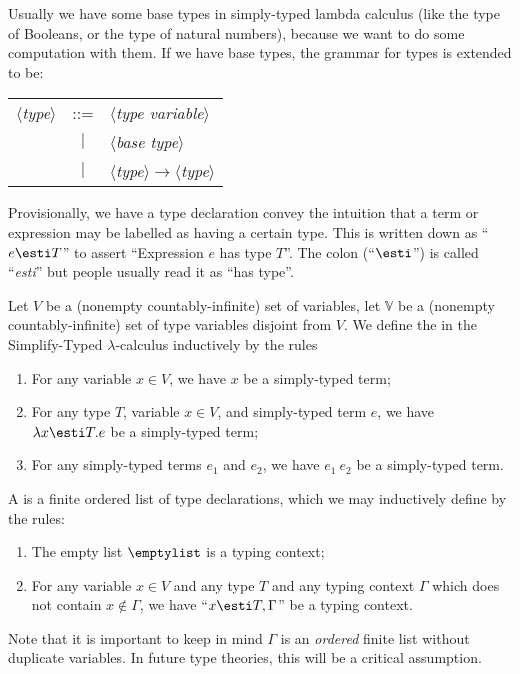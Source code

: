 \begin{node}[Syntax]
\begin{definition}
\begin{node}\label{stlc-0005}%
Usually we have some base types in simply-typed lambda calculus (like
the type of Booleans, or the type of natural numbers), because we want
to do some computation with them. If we have base types, the grammar for
types is extended to be:
\begin{center}
\begin{tabular}{rcl}
$\langle$\textit{type}$\rangle$ & ::= & $\langle$\textit{type variable}$\rangle$\\
& $|$ & $\langle$\textit{base type}$\rangle$\\
& $|$ & $\langle$\textit{type}$\rangle\to\langle$\textit{type}$\rangle$
\end{tabular}
\end{center}
\end{node}
\end{definition}

\begin{node}\label{stlc-0008}%
Provisionally, we have a type declaration convey the intuition that a
term or expression may be labelled as having a certain type. This is
written down as ``$e\esti T$'' to assert ``Expression $e$ has type
$T$''. The colon (``$\esti$'') is called ``\textit{esti}'' but people
usually read it as ``has type''.
\end{node}

\begin{definition}\label{stlc-0006}%
Let $V$ be a (nonempty countably-infinite) set of variables, let $\mathbb{V}$ be a (nonempty countably-infinite)
set of type variables disjoint from $V$. We define the
 in the Simplify-Typed $\lambda$-calculus inductively by
the rules
\begin{enumerate}
\item For any variable $x\in V$, we have $x$ be a simply-typed term;
\item For any type $T$, variable $x\in V$, and simply-typed term $e$, we
  have $\lambda x\esti T.e$ be a simply-typed term;
\item For any simply-typed terms $e_{1}$ and $e_{2}$, we have
  $e_{1}~e_{2}$ be a simply-typed term.
\end{enumerate}
\end{definition}

\begin{definition}\label{stlc-0009}%
A  is a finite ordered list of type declarations,
which we may inductively define by the rules:
\begin{enumerate}
\item The empty list $\emptylist$ is a typing context;
\item For any variable $x\in V$ and any type $T$ and any typing context
  $\Gamma$ which does not contain $x\notin\Gamma$,
  we have ``$x\esti T,\Gamma$'' be a typing context.
\end{enumerate}
Note that it is important to keep in mind $\Gamma$ is an \emph{ordered}
finite list without duplicate variables. In future type theories, this
will be a critical assumption.


\end{definition}
\end{node}
